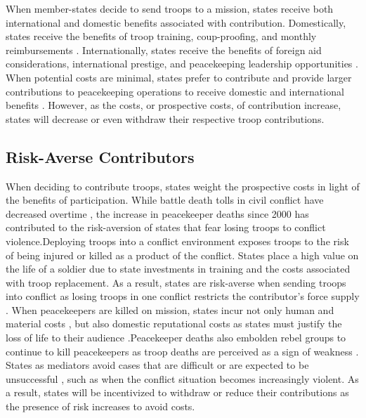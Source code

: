 \documentclass[12pt]{article}
\begin{document}
When member-states decide to send troops to a mission, states receive both international and domestic benefits associated with contribution. Domestically, states receive the benefits of troop training, coup-proofing, and monthly reimbursements \citep{kathman2017,lundgren2018}. Internationally, states receive the benefits of foreign aid considerations, international prestige, and peacekeeping leadership opportunities \citep{boutton2020,levin2020,lundgren2021,oksamytna2021}. When potential costs are minimal, states prefer to contribute and provide larger contributions to peacekeeping operations to receive domestic and international benefits \citep{bobrow1997maintaining}. However, as the costs, or prospective costs, of contribution increase, states will decrease or even withdraw their respective troop contributions. 

\subsection*{Risk-Averse Contributors}

When deciding to contribute troops, states weight the prospective costs in light of the benefits of participation. While battle death tolls in civil conflict have decreased overtime \citep{nils2016}, the increase in peacekeeper deaths since 2000 \citep{henke2019} has contributed to the risk-aversion of states that fear losing troops to conflict violence.\footnotemark[6] Deploying troops into a conflict environment exposes troops to the risk of being injured or killed as a product of the conflict. States place a high value on the life of a soldier due to state investments in training and the costs associated with troop replacement. As a result, states are risk-averse when sending troops into conflict \citep{bove2011} as losing troops in one conflict restricts the contributor's force supply \citep{von2008}. When peacekeepers are killed on mission, states incur not only human and material costs \citep{oestman2021price}, but also domestic reputational costs as states must justify the loss of life to their audience \citep{page2016}.\footnotemark[7] Peacekeeper deaths also embolden rebel groups to continue to kill peacekeepers as troop deaths are perceived as a sign of weakness \citep{levin2021}. States as mediators avoid cases that are difficult or are expected to be unsuccessful \citep{iwanami2014}, such as when the conflict situation becomes increasingly violent. As a result, states will be incentivized to withdraw or reduce their contributions as the presence of risk increases to avoid costs.
\end{document}
